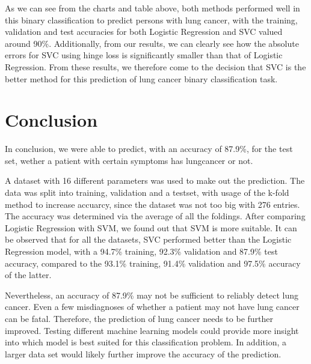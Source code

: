 \documentclass[a4paper,12pt]{article}
\begin{document}
As we can see from the charts and table above, both methods performed well in this binary classification to predict persons with lung cancer, with the training, validation and test accuracies for both Logistic Regression and SVC valued around 90\%.
Additionally, from our results, we can clearly see how the absolute errors for SVC using hinge loss is significantly smaller than that of Logistic Regression.
From these results, we therefore come to the decision that SVC is the better method for this prediction of lung cancer binary classification task.

\section{Conclusion}
\label{sec:orgeb901fd}

In conclusion, we were able to predict, with an accuracy of 87.9\%, for the test set, wether a patient with certain symptoms has lungcancer or not.

A dataset with 16 different parameters was used to make out the prediction.
The data was split into training, validation and a testset, with usage of the k-fold method to increase accuarcy, since the dataset was not too big with 276 entries.
The accuracy was determined via the average of all the foldings.
After comparing Logistic Regression with SVM, we found out that SVM is more suitable.
It can be observed that for all the datasets, SVC performed better than the Logistic Regression model, with a 94.7\% training, 92.3\% validation and 87.9\% test accuracy, compared to the 93.1\% training, 91.4\% validation and 97.5\% accuracy of the latter.

Nevertheless, an accuracy of 87.9\% may not be sufficient to reliably detect lung cancer.
Even a few misdiagnoses of whether a patient may not have lung cancer can be fatal. Therefore, the prediction of lung cancer needs to be further improved.
Testing different machine learning models could provide more insight into which model is best suited for this classification problem.
In addition, a larger data set would likely further improve the accuracy of the prediction.
\end{document}
